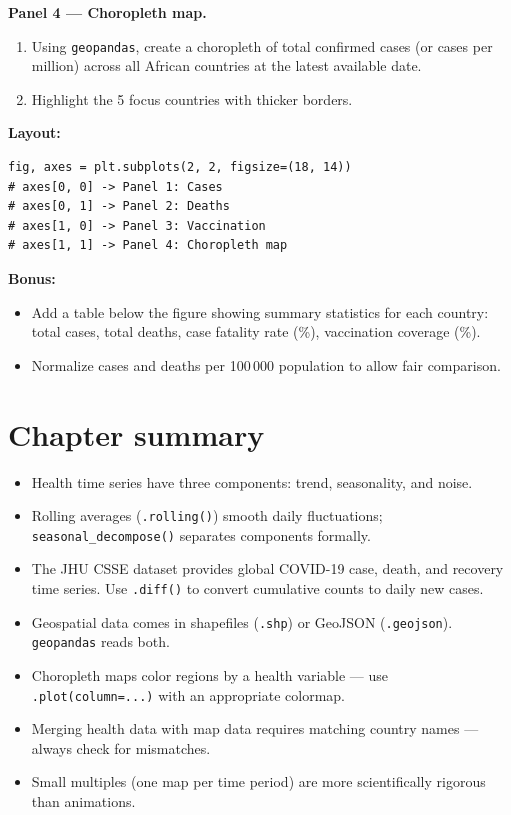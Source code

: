 \begin{exercise}
\textbf{Panel 4 --- Choropleth map.}
\begin{enumerate}
  \item Using \texttt{geopandas}, create a choropleth of total confirmed cases (or cases per million) across all African countries at the latest available date.
  \item Highlight the 5 focus countries with thicker borders.
\end{enumerate}

\textbf{Layout:}
\begin{verbatim}
fig, axes = plt.subplots(2, 2, figsize=(18, 14))
# axes[0, 0] -> Panel 1: Cases
# axes[0, 1] -> Panel 2: Deaths
# axes[1, 0] -> Panel 3: Vaccination
# axes[1, 1] -> Panel 4: Choropleth map
\end{verbatim}

\textbf{Bonus:}
\begin{itemize}
  \item Add a table below the figure showing summary statistics for each country: total cases, total deaths, case fatality rate (\%), vaccination coverage (\%).
  \item Normalize cases and deaths per 100\,000 population to allow fair comparison.
\end{itemize}
\end{exercise}

\section{Chapter summary}

\begin{itemize}
  \item Health time series have three components: trend, seasonality, and noise.
  \item Rolling averages (\texttt{.rolling()}) smooth daily fluctuations; \texttt{seasonal\_decompose()} separates components formally.
  \item The JHU CSSE dataset provides global COVID-19 case, death, and recovery time series. Use \texttt{.diff()} to convert cumulative counts to daily new cases.
  \item Geospatial data comes in shapefiles (\texttt{.shp}) or GeoJSON (\texttt{.geojson}). \texttt{geopandas} reads both.
  \item Choropleth maps color regions by a health variable --- use \texttt{.plot(column=...)} with an appropriate colormap.
  \item Merging health data with map data requires matching country names --- always check for mismatches.
  \item Small multiples (one map per time period) are more scientifically rigorous than animations.
\end{itemize}
